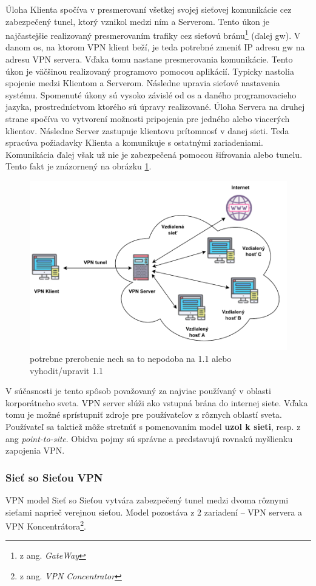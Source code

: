 Úloha Klienta spočíva v presmerovaní všetkej svojej sieťovej komunikácie cez zabezpečený tunel, ktorý vznikol medzi ním a Serverom. Tento úkon je najčastejšie realizovaný presmerovaním trafiky cez sieťovú bránu\footnote{z ang. \textit{GateWay}} (ďalej \acrshort{gw}). V danom \acrshort{os}, na ktorom VPN klient beží, je teda potrebné zmeniť IP adresu \acrshort{gw} na adresu VPN servera. Vďaka tomu nastane presmerovania komunikácie. Tento úkon je väčšinou realizovaný programovo pomocou aplikácií. Typicky nastolia spojenie medzi Klientom a Serverom. Následne upravia sieťové nastavenia systému. Spomenuté úkony sú vysoko závislé od \acrshort{os} a daného programovacieho jazyka, prostredníctvom ktorého sú úpravy realizované. 
Úloha Servera na druhej strane spočíva vo vytvorení možnosti pripojenia pre jedného alebo viacerých klientov. Následne Server zastupuje klientovu prítomnosť v danej sieti. Teda spracúva požiadavky Klienta a komunikuje s ostatnými zariadeniami. Komunikácia ďalej však už nie je zabezpečená pomocou šifrovania alebo tunelu. Tento fakt je znázornený na obrázku \ref{c2s}.   

\begin{figure}[!ht]
	\centering
	\includegraphics[width=.7\textwidth]{figures/c2s}
	\caption{potrebne prerobenie nech sa to nepodoba na 1.1 alebo vyhodit/upravit 1.1}
	\label{c2s}
\end{figure}
V súčasnosti je tento spôsob považovaný za najviac používaný v oblasti korporátneho sveta. VPN server slúži ako vstupná brána do internej siete. Vďaka tomu je možné sprístupniť zdroje pre používateľov z rôznych oblastí sveta. Používateľ sa taktiež môže stretnúť s pomenovaním model \textbf{uzol k sieti}, resp. z ang \textit{point-to-site}. Obidva pojmy sú správne a predstavujú rovnakú myšlienku zapojenia VPN.  
\subsubsection{Sieť so Sieťou VPN}
VPN model Sieť so Sieťou vytvára zabezpečený tunel medzi dvoma rôznymi sieťami naprieč verejnou sieťou. Model pozostáva z 2 zariadení -- VPN servera a VPN Koncentrátora\footnote{z ang. \textit{VPN Concentrator}}.

